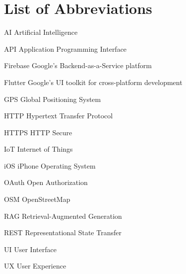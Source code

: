 \chapter*{List of Abbreviations}
\begin{abbrv}
    
    \item[AI]                Artificial Intelligence
    \item[API]               Application Programming Interface
    \item[Firebase]          Google's Backend-as-a-Service platform
    \item[Flutter]           Google's UI toolkit for cross-platform development
    \item[GPS]               Global Positioning System
    \item[HTTP]              Hypertext Transfer Protocol
    \item[HTTPS]             HTTP Secure
    \item[IoT]               Internet of Things
    \item[iOS]               iPhone Operating System
    \item[OAuth]             Open Authorization
    \item[OSM]               OpenStreetMap
    \item[RAG]               Retrieval-Augmented Generation
    \item[REST]              Representational State Transfer
    \item[UI]                User Interface
    \item[UX]                User Experience
    
\end{abbrv}
